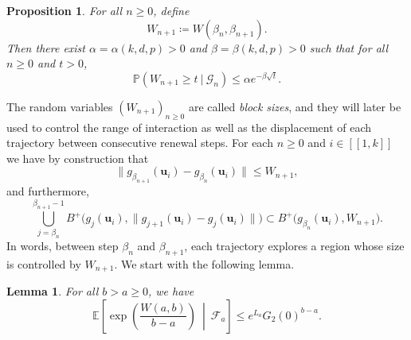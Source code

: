 \documentclass[a4paper, 11pt]{article}
\theoremstyle{plain}
\newtheorem{Lemma}[Theorem]{Lemma}
\newtheorem{Proposition}[Theorem]{Proposition}
\theoremstyle{definition}
\newcommand{\E}{\mathbb{E}}
\renewcommand{\P}{\mathbb{P}}
\newcommand{\range}[2]{[\![#1,#2]\!]}
\numberwithin{equation}{section}
\begin{document}
\begin{Proposition}
    \label{prop_block_size}
    For all $n\geq 0$, define 
        \[W_{n+1}\coloneqq W(\beta_n,\beta_{n+1}).\]
    Then there exist $\alpha=\alpha(k, d, p)>0$ and $\beta=\beta(k, d, p)>0$ such that for all $n\geq0$ and $t>0$,
        \[\P(W_{n+1}\geq t~|~\mathcal G_n)\leq\alpha e^{-\beta \sqrt t}.\]
\end{Proposition}


The random variables $(W_{n+1})_{n\geq 0}$ are called \emph{block sizes}, and they will later be used to control the range of interaction as well as the displacement of each trajectory between consecutive renewal steps. For each $n\geq 0$ and $i\in\range{1}{k}$ we have by construction that
    \[\|g_{\beta_{n+1}}(\mathbf u_i)-g_{\beta_n}(\mathbf u_i)\|\leq W_{n+1},\]
and furthermore,
    \[\bigcup_{j=\beta_n}^{\beta_{n+1}-1}B^+\big(g_j(\mathbf u_i), \|g_{j+1}(\mathbf u_i)-g_j(\mathbf u_i)\|\big)\subset B^+\big(g_{\beta_n}(\mathbf u_i), W_{n+1}\big).\]
In words, between step $\beta_n$ and $\beta_{n+1}$, each trajectory explores a region whose size is controlled by $W_{n+1}$. We start with the following lemma.


\begin{Lemma}
    \label{lemma_Wab}
    For all $b>a\geq 0$, we have
        \[\E\left[\exp\left(\frac{W(a, b)}{b-a}\right)~\middle\vert~\mathcal F_a\right]\leq e^{L_a}G_2(0)^{b-a}.\]
\end{Lemma}
\end{document}
